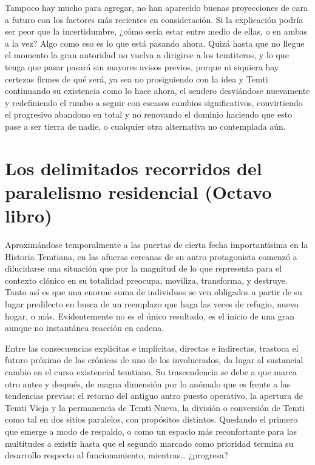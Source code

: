 \documentclass[
  spanish,
]{book}
\begin{document}
Tampoco hay mucho para agregar, no han aparecido buenas proyecciones de cara a futuro con los factores más recientes en consideración. Si la explicación podría ser peor que la incertidumbre, ¿cómo sería estar entre medio de ellas, o en ambas a la vez? Algo como eso es lo que está pasando ahora. Quizá hasta que no llegue el momento la gran autoridad no vuelva a dirigirse a los temtiteros, y lo que tenga que pasar pasará sin mayores avisos previos, porque ni siquiera hay certezas firmes de qué será, ya sea no prosiguiendo con la idea y Temti continuando su existencia como lo hace ahora, el sendero desviándose nuevamente y redefiniendo el rumbo a seguir con escasos cambios significativos, convirtiendo el progresivo abandono en total y no renovando el dominio haciendo que esto pase a ser tierra de nadie, o cualquier otra alternativa no contemplada aún.

\hypertarget{los-delimitados-recorridos-del-paralelismo-residencial-octavo-libro}{%
\chapter{Los delimitados recorridos del paralelismo residencial (Octavo libro)}\label{los-delimitados-recorridos-del-paralelismo-residencial-octavo-libro}}

Aproximándose temporalmente a las puertas de cierta fecha importantisima en la Historia Temtiana, en las afueras cercanas de su antro protagonista comenzó a dilucidarse una situación que por la magnitud de lo que representa para el contexto clónico en su totalidad preocupa, moviliza, transforma, y destruye. Tanto así es que una enorme suma de individuos se ven obligados a partir de su lugar predilecto en busca de un reemplazo que haga las veces de refugio, nuevo hogar, o más. Evidentemente no es el único resultado, es el inicio de una gran aunque no instantánea reacción en cadena.

Entre las consecuencias explicitas e implícitas, directas e indirectas, trastoca el futuro próximo de las crónicas de uno de los involucrados, da lugar al sustancial cambio en el curso existencial temtiano. Su trascendencia se debe a que marca otro antes y después, de magna dimensión por lo anómalo que es frente a las tendencias previas: el retorno del antiguo antro puesto operativo, la apertura de Temti Vieja y la permanencia de Temti Nueva, la división o conversión de Temti como tal en dos sitios paralelos, con propósitos distintos. Quedando el primero que emerge a modo de respaldo, o como un espacio más reconfortante para las multitudes a existir hasta que el segundo marcado como prioridad termina su desarrollo respecto al funcionamiento, mientras\ldots{} ¿progresa?
\end{document}
